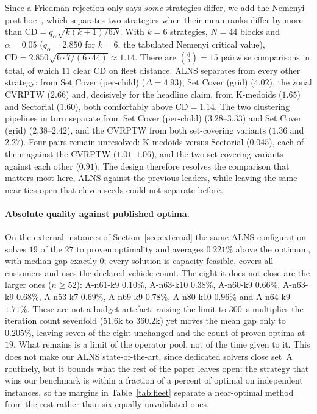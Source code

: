 \documentclass[graybox]{SNmult}
\begin{document}
Since a Friedman rejection only says \emph{some} strategies differ, we
add the Nemenyi post-hoc~\cite{Demsar2006Statistical}, which separates
two strategies when their mean ranks differ by more than
$\mathrm{CD}=q_\alpha\sqrt{k(k+1)/6N}$. With $k=6$ strategies, $N=44$
blocks and $\alpha=0.05$ ($q_\alpha=2.850$ for $k=6$, the tabulated
Nemenyi critical value), $\mathrm{CD}=2.850\sqrt{6\cdot7/(6\cdot44)}
\approx 1.14$. There are $\binom{6}{2}=15$ pairwise comparisons in
total, of which $11$ clear $\mathrm{CD}$ on fleet distance. ALNS
separates from every other strategy: from Set Cover (per-child)
($\Delta=4.93$), Set Cover (grid) ($4.02$), the zonal CVRPTW ($2.66$) and,
decisively for the headline claim, from K-medoids ($1.65$) and Sectorial
($1.60$), both comfortably above $\mathrm{CD}=1.14$. The two clustering
pipelines in turn separate from Set Cover (per-child) ($3.28$--$3.33$) and
Set Cover (grid) ($2.38$--$2.42$), and the CVRPTW from both set-covering
variants ($1.36$ and $2.27$). Four pairs remain unresolved: K-medoids
versus Sectorial ($0.045$), each of them against the CVRPTW
($1.01$--$1.06$), and the two set-covering variants against each other
($0.91$). The design therefore resolves the comparison that matters most
here, ALNS against the previous leaders, while leaving the same
near-ties open that eleven seeds could not separate before.

\paragraph{Absolute quality against published optima.}
On the external instances of Section~\ref{sec:external} the same ALNS
configuration solves $19$ of the $27$ to proven optimality and averages
$0.221\%$ above the optimum, with median gap exactly $0$; every solution
is capacity-feasible, covers all customers and uses the declared vehicle
count. The eight it does not close are the larger ones ($n\ge52$):
A-n61-k9 $0.10\%$, A-n63-k10 $0.38\%$, A-n60-k9 $0.66\%$, A-n63-k9
$0.68\%$, A-n53-k7 $0.69\%$, A-n69-k9 $0.78\%$, A-n80-k10 $0.96\%$ and
A-n64-k9 $1.71\%$. These are not a budget artefact: raising the limit to
$300$~s multiplies the iteration count sevenfold ($51.6$k to $360.2$k) yet
moves the mean gap only to $0.205\%$, leaving seven of the eight unchanged
and the count of proven optima at $19$. What remains is a limit of the
operator pool, not of the time given to it. This does not make our ALNS state-of-the-art, since dedicated solvers
close set~A routinely, but it bounds what the rest of the paper leaves
open: the strategy that wins our benchmark is within a fraction of a
percent of optimal on independent instances, so the margins in
Table~\ref{tab:fleet} separate a near-optimal method from the rest rather
than six equally unvalidated ones.
\end{document}
